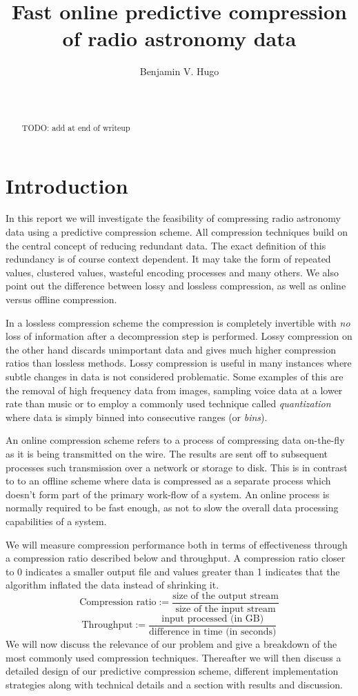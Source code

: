 \documentclass{acm_proc_article-sp}
\title{Fast online predictive compression of radio astronomy data}
\author{
\alignauthor
Benjamin V. Hugo\\
       \affaddr{Department of Computer Science}\\
       \affaddr{University of Cape Town}\\
       \email{bennahugo@aol.com}
}
\begin{document}
\maketitle
\begin{abstract}
 {\color{red}TODO: add at end of writeup}
\end{abstract}

\section{Introduction}
In this report we will investigate the feasibility of compressing radio astronomy data using a predictive compression scheme. All compression techniques
build on the central concept of reducing redundant data. The exact definition of this redundancy is of course context dependent. It may take the form of 
repeated values, clustered values, wasteful encoding processes and many others. We also point out the difference between lossy and lossless compression, as
well as online versus offline compression.

In a lossless compression scheme the compression is completely invertible with \textit{no} loss of information after a decompression step is performed. Lossy
compression on the other hand discards unimportant data and gives much higher compression ratios than lossless methods. Lossy compression is useful in many
instances where subtle changes in data is not considered problematic. Some examples of this are the removal of high frequency data from images, sampling 
voice data at a lower rate than music or to employ a commonly used technique called \textit{quantization} where data is simply binned into consecutive ranges 
(or \textit{bins}).

An online compression scheme refers to a process of compressing data on-the-fly as it is being transmitted on the wire. The results are sent off to subsequent 
processes such transmission over a network or storage to disk. This is in contrast to to an offline scheme where data is compressed as a separate process which doesn't
form part of the primary work-flow of a system. An online process is normally required to be fast enough, as not to slow the overall data processing capabilities of 
a system.

We will measure compression performance both in terms of effectiveness through a compression ratio described below \cite[p. 10]{salomon2004data} and throughput. A 
compression ratio closer to 0 indicates a smaller output file and values greater than 1 indicates that the algorithm inflated the data instead of shrinking it.
\begin{equation}
 \text{Compression ratio} := \frac{\text{size of the output stream}}{\text{size of the input stream}}
\end{equation}
\begin{equation}
 \text{Throughput} := \frac{\text{input processed (in GB)}}{\text{difference in time (in seconds)}}
\end{equation}
We will now discuss the relevance of our problem and give a breakdown of the most commonly used compression techniques. Thereafter we will then discuss a detailed design
of our predictive compression scheme, different implementation strategies along with technical details and a section with results and discussion.
\end{document}
